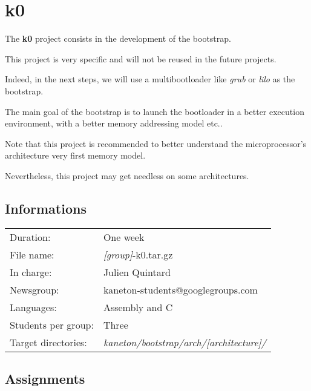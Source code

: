 
%
%

\chapter{k0}

The \textbf{k0} project consists in the development of the bootstrap.

This project is very specific and will not be reused in the future
projects.

Indeed, in the next steps, we will use a multibootloader like \textit{grub}
or \textit{lilo} as the bootstrap.

The main goal of the bootstrap is to launch the bootloader in a better
execution environment, with a better memory addressing model etc..

Note that this project is recommended to better understand the
microprocessor's architecture very first memory model.

Nevertheless, this project may get needless on some architectures.

\newpage

%
%

\section{Informations}

\begin{tabular}{p{7cm}l}
Duration: & One week \\
File name: & \textit{[group]}-k0.tar.gz \\
In charge: & Julien Quintard \\
Newsgroup: & kaneton-students@googlegroups.com \\
Languages: & Assembly and C \\
Students per group: & Three \\
Target directories: & \textit{kaneton/bootstrap/arch/[architecture]/} \\
\end{tabular}

%
%

\section{Assignments}

